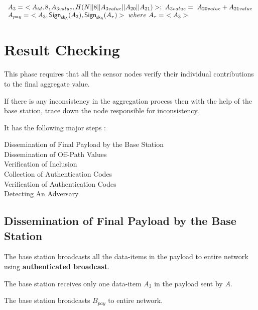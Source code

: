 \documentclass[%
  slidesonly,%
  semlayer%
  ]{seminar}                                  %
\newcommand{\sk}{\sf{sk}}
\begin{document}
\begin{slide}
      \begin{equation*}
        \begin{array}{l}
        A_{3} =\ <A_{id}, 8, A_{3value}, H(N||8||A_{3value}||A_{20}||A_{21})>;\ A_{3value} =\ A_{20value} + A_{21value}\\
        A_{pay} =\ <A_{3},\textsf{Sign}_{\sk_{A}}(A_{3}),\textsf{Sign}_{\sk_{A}}(A_{\tau})>\ where\ A_{\tau} =\ <A_{3}>
        \end{array}
      \end{equation*}
     \clearpage

  \section*{Result Checking}
    This phase requires that all the sensor nodes verify their individual contributions to the final aggregate value.

    If there is any inconsistency in the aggregation process then with the help of the base station, trace down the node responsible for inconsistency.

    It has the following major steps :
    \begin{description}
      \item [Dissemination of Final Payload by the Base Station]
      \item [Dissemination of Off-Path Values]
      \item [Verification of Inclusion]
      \item [Collection of Authentication Codes]
      \item [Verification of Authentication Codes]
      \item [Detecting An Adversary]
    \end{description}

    \clearpage

    \subsection*{Dissemination of Final Payload by the Base Station}

      The base station broadcasts all the data-items in the payload to entire network using \textbf{authenticated broadcast}.
        
      The base station receives only one data-item $A_{3}$ in the payload sent by $A$.
      
      The base station broadcasts $B_{pay}$ to entire network.


\end{slide}
\end{document}
